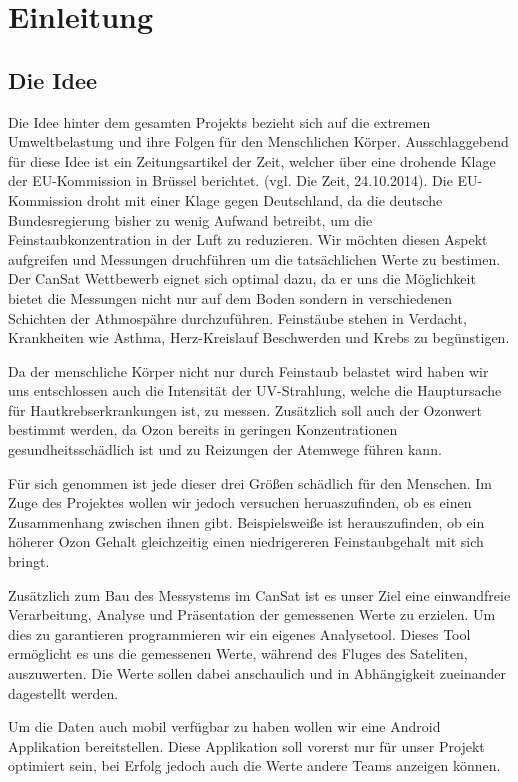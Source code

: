 \section{Einleitung}
\subsection{Die Idee}

Die Idee hinter dem gesamten Projekts bezieht sich auf die extremen Umweltbelastung und ihre Folgen für den Menschlichen Körper. Ausschlaggebend für diese Idee ist ein Zeitungsartikel der Zeit, welcher über eine drohende Klage der EU-Kommission in Brüssel berichtet. (vgl. Die Zeit, 24.10.2014). Die EU-Kommission droht mit einer Klage gegen Deutschland, da die deutsche Bundesregierung bisher zu wenig Aufwand betreibt, um die Feinstaubkonzentration in der Luft zu reduzieren. Wir möchten diesen Aspekt aufgreifen und Messungen druchführen um die tatsächlichen Werte zu bestimen. Der CanSat Wettbewerb eignet sich optimal dazu, da er uns die Möglichkeit bietet die Messungen nicht nur auf dem Boden sondern in verschiedenen Schichten der Athmospähre durchzuführen. Feinstäube stehen in Verdacht, Krankheiten wie Asthma, Herz-Kreislauf Beschwerden und Krebs zu begünstigen.

Da der menschliche Körper nicht nur durch Feinstaub belastet wird haben wir uns entschlossen auch die Intensität der UV-Strahlung, welche die Hauptursache für Hautkrebserkrankungen ist, zu messen. Zusätzlich soll auch der Ozonwert bestimmt werden, da Ozon bereits in geringen Konzentrationen gesundheitsschädlich ist und zu Reizungen der Atemwege führen kann.

Für sich genommen ist jede dieser drei Größen schädlich für den Menschen. Im Zuge des Projektes wollen wir jedoch versuchen heruaszufinden, ob es einen Zusammenhang zwischen ihnen gibt. Beispielsweiße ist herauszufinden, ob ein höherer Ozon Gehalt gleichzeitig einen niedrigereren Feinstaubgehalt mit sich bringt.

Zusätzlich zum Bau des Messystems im CanSat ist es unser Ziel eine einwandfreie Verarbeitung, Analyse und Präsentation der gemessenen Werte zu erzielen. Um dies zu garantieren programmieren wir ein eigenes Analysetool. Dieses Tool ermöglicht es uns die gemessenen Werte, während des Fluges des Sateliten, auszuwerten. Die Werte sollen dabei anschaulich und in Abhängigkeit zueinander dagestellt werden.

Um die Daten auch mobil verfügbar zu haben wollen wir eine Android Applikation bereitstellen. Diese Applikation soll vorerst nur für unser Projekt optimiert sein, bei Erfolg jedoch auch die Werte andere Teams anzeigen können.


